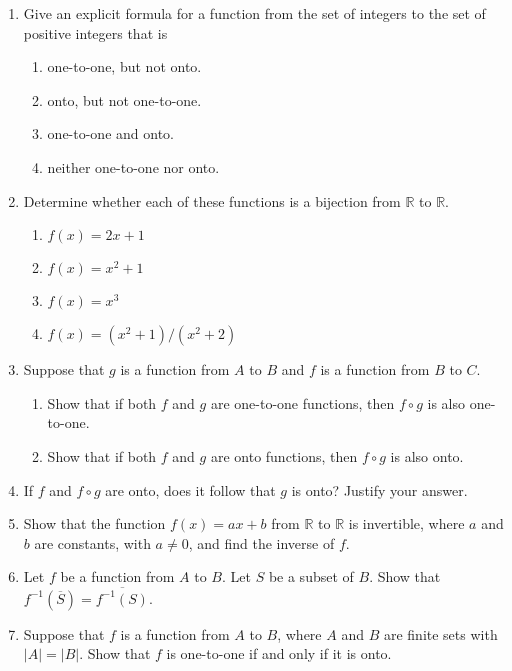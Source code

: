 \documentclass{../../cls/sig-alternate-05-2015}
\begin{document}
\begin{enumerate}
\item Give an explicit formula for a function from the set of
integers to the set of positive integers that is
    \begin{enumerate}
    \item one-to-one, but not onto.
    \item onto, but not one-to-one.
    \item one-to-one and onto.
    \item neither one-to-one nor onto.
    \end{enumerate}

\item Determine whether each of these functions is a bijection
from $\mathbb{R}$ to $\mathbb{R}$.
    \begin{enumerate}
        \item $f(x)=2x+1$
        \item $f(x)=x^2+1$
        \item $f(x)=x^3$
        \item $f(x)=(x^2+1)/(x^2+2)$
    \end{enumerate}

\item 
Suppose that $g$ is a function from $A$ to $B$ and $f$ is a
function from $B$ to $C$.
    \begin{enumerate}
        \item Show that if both $f$ and $g$ are one-to-one functions,
        then $f\circ g$ is also one-to-one.
        
        \item Show that if both $f$ and $g$ are onto functions, then
        $f \circ  g$ is also onto.
    \end{enumerate}
    
\item If $f$ and $f \circ g$ are onto, does it follow that $g$ is onto?
Justify your answer.

\item Show that the function $f (x) = ax + b$ from  $\mathbb{R}$ to  $\mathbb{R}$ is
invertible, where $a$ and $b$ are constants, with $a\neq 0$, and
find the inverse of $f$.

\item Let $f$ be a function from $A$ to $B$. Let $S$ be a subset of $B$.
Show that $f^{-1}(\overline{S})=\overline{f^{-1}(S)}$.

\item Suppose that $f$ is a function from $A$ to $B$, where $A$ and $B$
are finite sets with $|A| = |B|$. Show that $f$ is one-to-one
if and only if it is onto.


\end{enumerate}
\end{document}
